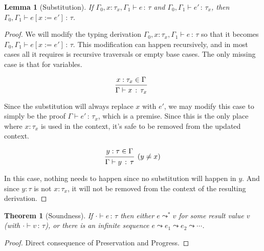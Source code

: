 \documentclass{article}
\newcommand{\todo}[1]{\colorbox{red}{#1}}
\newtheorem{theorem}{Theorem}
\newtheorem{lemma}{Lemma}
\newcommand{\hastp}[3]{#1 \vdash #2 \,:\, #3}
\newcommand{\steps}[2]{#1 \leadsto^* #2}
\newcommand{\deduct}[3][]
{
  \begin{prooftree}
    \hypo{#2}
    \infer1[\text{#1}]{#3}
  \end{prooftree}
}
\begin{document}
\begin{lemma}[Substitution] \label{lem:substitution} If \(\hastp {\Gamma_0, x :
    \tau_x, \Gamma_1} e \tau\) and \(\hastp {\Gamma_0, \Gamma_1} {e'}
  {\tau_x}\), then \(\hastp {\Gamma_0, \Gamma_1} {e[x:=e']} \tau\).
\end{lemma}

\begin{proof}


  We will modify the typing derivation \(\hastp {\Gamma_0, x : \tau_x, \Gamma_1}
  e \tau\) so that it becomes \(\hastp {\Gamma_0, \Gamma_1} {e[x:=e']} \tau\).
  This modification can happen recursively, and in most cases all it requires is
  recursive traversals or empty base cases. The only missing case is that for
  variables.

  \[
    \deduct
      {x : {\tau_x} \in \Gamma}
      {\hastp \Gamma x {\tau_x}}
  \]

  Since the substitution will always replace \(x\) with \(e'\), we may modify
  this case to simply be the proof \(\hastp \Gamma {e'} {\tau_x}\), which is a
  premise. Since this is the only place where \(x : \tau_x\) is used in the
  context, it's safe to be removed from the updated context.

  \[
    \deduct
      {y : \tau \in \Gamma}
      {\hastp \Gamma y \tau}
      {(y \ne x)}
  \]

  In this case, nothing needs to happen since no substitution will happen in
  \(y\). And since \(y : \tau\) is not \(x : \tau_x\), it will not be removed
  from the context of the resulting derivation.
\end{proof}

\begin{theorem}[Soundness]
If $\hastp{\cdot}{e}{\tau}$ then either $\steps{e}{v}$ for some result value $v$
(with $\hastp{\cdot}{v}{\tau}$), or
there is an infinite sequence $e \leadsto e_1 \leadsto e_2 \leadsto \cdots$.
\end{theorem}

\begin{proof}
Direct consequence of Preservation and Progress.
\end{proof}
\end{document}
